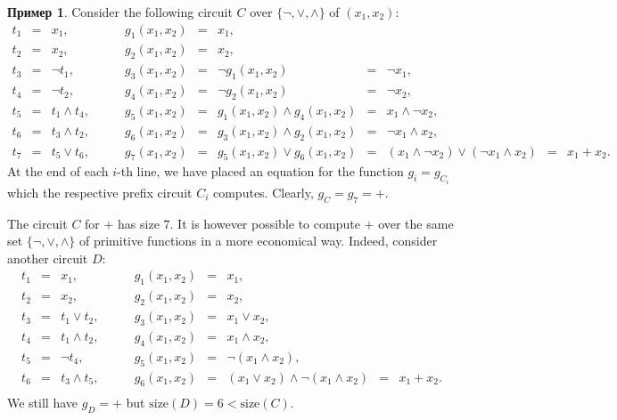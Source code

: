 \documentclass[12pt,notitlepage]{article}
\theoremstyle{plain}
\theoremstyle{definition}
\newtheorem{exm}[thm]{Пример}
\theoremstyle{plain}
\newcommand{\1}{\mathbf{1}}
\newcommand{\0}{\mathbf{0}}
\begin{document}
\begin{exm}\label{bool:xor_circuits}
	Consider the following circuit $C$ over $\{ {\neg}, {\vee}, {\wedge} \}$ of $(x_1, x_2)$:
	$$
	\begin{array}{rclrclclcl}
		t_1 &=& x_1,\qquad &g_1(x_1, x_2) &=& x_1,\\
		t_2 &=& x_2,\qquad &g_2(x_1, x_2) &=& x_2,\\
		t_3 &=& \neg t_1,\qquad &g_3(x_1, x_2) &=&  \neg g_1(x_1, x_2) &=&  \neg x_1,\\
		t_4 &=& \neg t_2,\qquad &g_4(x_1, x_2) &=&  \neg g_2(x_1, x_2) &=&  \neg x_2,\\
		t_5 &=& t_1 \wedge t_4,\qquad &g_5(x_1, x_2) &=&  g_1(x_1, x_2) \wedge g_4(x_1, x_2) &=&  x_1 \wedge \neg x_2,\\
		t_6 &=& t_3 \wedge t_2,\qquad &g_6(x_1, x_2) &=&  g_3(x_1, x_2) \wedge g_2(x_1, x_2) &=&  \neg x_1 \wedge x_2,\\
		t_7 &=& t_5 \vee t_6,\qquad &g_7(x_1, x_2) &=&  g_5(x_1, x_2) \vee g_6(x_1, x_2) &=& (x_1 \wedge \neg x_2) \vee (\neg x_1 \wedge x_2) &=& x_1 + x_2.
	\end{array}
	$$
	At the end of each $i$-th line, we have placed an equation for the function $g_i = g_{C_i}$ which the respective prefix circuit $C_i$ computes. Clearly, $g_C = g_7 = {+}$.
	
	The circuit $C$ for ${+}$ has size $7$. It is however possible to compute ${+}$ over the same set $\{ {\neg}, {\vee}, {\wedge} \}$ of primitive functions in a more economical way. Indeed, consider another circuit $D$:
	$$
	\begin{array}{rclrclcl}
		t_1 &=& x_1,\qquad &g_1(x_1, x_2) &=& x_1,\\
		t_2 &=& x_2,\qquad &g_2(x_1, x_2) &=& x_2,\\
		t_3 &=& t_1 \vee t_2,\qquad &g_3(x_1, x_2) &=&  x_1 \vee x_2,\\
		t_4 &=& t_1 \wedge t_2,\qquad &g_4(x_1, x_2) &=& x_1 \wedge x_2,\\
		t_5 &=& \neg t_4,\qquad &g_5(x_1, x_2) &=&  \neg (x_1 \wedge x_2),\\
		t_6 &=& t_3 \wedge t_5,\qquad &g_6(x_1, x_2) &=&  (x_1 \vee x_2) \wedge \neg (x_1 \wedge x_2) &=& x_1 + x_2.\\
	\end{array}
	$$
	We still have $g_D = {+}$ but $\mathrm{size}(D) = 6 < \mathrm{size}(C)$.
\end{exm}
\end{document}
